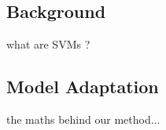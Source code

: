 \subsection{Background}

what are SVMs ?

\subsection{Model Adaptation}

the maths behind our method...
